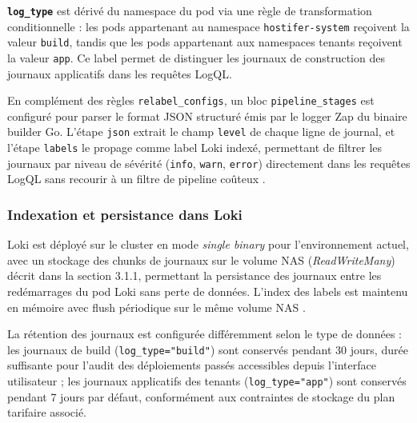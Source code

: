 \textbf{\texttt{log\_type}} est dérivé du namespace du pod via une règle de transformation conditionnelle : les pods appartenant au namespace \texttt{hostifer-system} reçoivent la valeur \texttt{build}, tandis que les pods appartenant aux namespaces tenants reçoivent la valeur \texttt{app}. Ce label permet de distinguer les journaux de construction des journaux applicatifs dans les requêtes LogQL.

En complément des règles \texttt{relabel\_configs}, un bloc \texttt{pipeline\_stages} est configuré pour parser le format JSON structuré émis par le logger Zap du binaire builder Go. L'étape \texttt{json} extrait le champ \texttt{level} de chaque ligne de journal, et l'étape \texttt{labels} le propage comme label Loki indexé, permettant de filtrer les journaux par niveau de sévérité (\texttt{info}, \texttt{warn}, \texttt{error}) directement dans les requêtes LogQL sans recourir à un filtre de pipeline coûteux \cite{loki-logql-queries}.

\subsubsection*{Indexation et persistance dans Loki}

Loki est déployé sur le cluster en mode \textit{single binary} pour l'environnement actuel, avec un stockage des chunks de journaux sur le volume NAS (\textit{ReadWriteMany}) décrit dans la section 3.1.1, permettant la persistance des journaux entre les redémarrages du pod Loki sans perte de données. L'index des labels est maintenu en mémoire avec flush périodique sur le même volume NAS \cite{loki-http-api}.

La rétention des journaux est configurée différemment selon le type de données : les journaux de build (\texttt{log\_type="build"}) sont conservés pendant 30 jours, durée suffisante pour l'audit des déploiements passés accessibles depuis l'interface utilisateur ; les journaux applicatifs des tenants (\texttt{log\_type="app"}) sont conservés pendant 7 jours par défaut, conformément aux contraintes de stockage du plan tarifaire associé.

